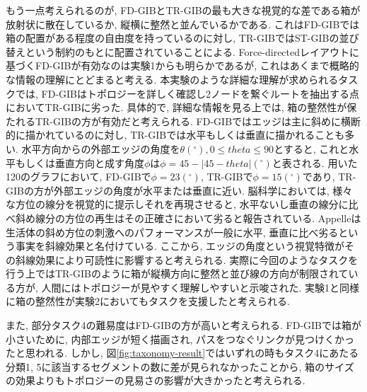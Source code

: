 \documentclass{kuee}
\begin{document}
もう一点考えられるのが, FD-GIBとTR-GIBの最も大きな視覚的な差である箱が放射状に散在しているか, 縦横に整然と並んでいるかである.
これはFD-GIBでは箱の配置がある程度の自由度を持っているのに対し, TR-GIBではST-GIBの並び替えという制約のもとに配置されていることによる.
Force-directedレイアウトに基づくFD-GIBが有効なのは実験1からも明らかであるが, これはあくまで概略的な情報の理解にとどまると考える.
本実験のような詳細な理解が求められるタスクでは, FD-GIBはトポロジーを詳しく確認し2ノードを繋ぐルートを抽出する点においてTR-GIBに劣った.
具体的で, 詳細な情報を見る上では, 箱の整然性が保たれるTR-GIBの方が有効だと考えられる.
FD-GIBではエッジは主に斜めに横断的に描かれているのに対し, TR-GIBでは水平もしくは垂直に描かれることも多い.
水平方向からの外部エッジの角度を$\theta (^\circ), 0 \le theta \le 90$とすると, これと水平もしくは垂直方向と成す角度$\phi$は$\phi = 45 - |45 - theta|(^\circ)$と表される.
用いた120のグラフにおいて, FD-GIBで$\phi = 23(^\circ)$, TR-GIBで$\phi = 15(^\circ)$であり, TR-GIBの方が外部エッジの角度が水平または垂直に近い.
脳科学においては, 様々な方位の線分を視覚的に提示しそれを再現させると, 水平ないし垂直の線分に比べ斜め線分の方位の再生はその正確さにおいて劣ると報告されている\cite{jastrow}.
Appelleは生活体の斜め方位の刺激へのパフォーマンスが一般に水平, 垂直に比べ劣るという事実を斜線効果と名付けている\cite{appelle1972perception}.
ここから, エッジの角度という視覚特徴がその斜線効果により可読性に影響すると考えられる.
実際に今回のようなタスクを行う上ではTR-GIBのように箱が縦横方向に整然と並び線の方向が制限されている方が, 人間にはトポロジーが見やすく理解しやすいと示唆された.
実験1と同様に箱の整然性が実験2においてもタスクを支援したと考えられる.

また, 部分タスク4の難易度はFD-GIBの方が高いと考えられる.
FD-GIBでは箱が小さいために, 内部エッジが短く描画され, パスをつなぐリンクが見つけくかったと思われる.
しかし, 図\ref{fig:taxonomy-result}ではいずれの時もタスク4にあたる分類1, 5に該当するセグメントの数に差が見られなかったことから, 箱のサイズの効果よりもトポロジーの見易さの影響が大きかったと考えられる.
\end{document}
